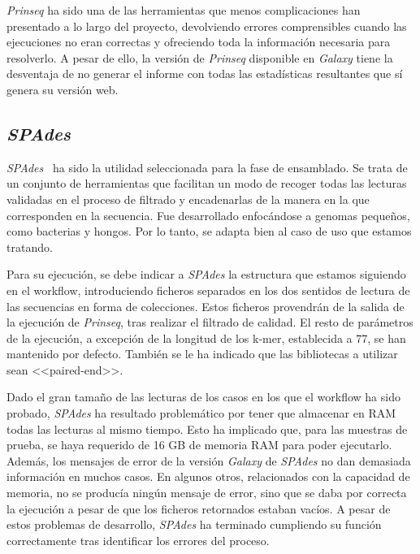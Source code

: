 \textit{Prinseq} ha sido una de las herramientas que menos complicaciones han presentado a lo largo del proyecto, devolviendo errores comprensibles cuando las ejecuciones no eran correctas y ofreciendo toda la información necesaria para resolverlo. A pesar de ello, la versión de \textit{Prinseq} disponible en \textit{Galaxy} tiene la desventaja de no generar el informe con todas las estadísticas resultantes que sí genera su versión web.

\subsection{\itshape{SPAdes}}
\textit{SPAdes}~\cite{Nurk2013} ha sido la utilidad seleccionada para la fase de ensamblado. Se trata de un conjunto de herramientas que facilitan un modo de recoger todas las lecturas validadas en el proceso de filtrado y encadenarlas de la manera en la que corresponden en la secuencia. Fue desarrollado enfocándose a genomas pequeños, como bacterias y hongos. Por lo tanto, se adapta bien al caso de uso que estamos tratando.

Para su ejecución, se debe indicar a \textit{SPAdes} la estructura que estamos siguiendo en el workflow, introduciendo ficheros separados en los dos sentidos de lectura de las secuencias en forma de colecciones. Estos ficheros provendrán de la salida de la ejecución de \textit{Prinseq}, tras realizar el filtrado de calidad. El resto de parámetros de la ejecución, a excepción de la longitud de los k-mer, establecida a 77, se han mantenido por defecto. También se le ha indicado que las bibliotecas a utilizar sean <<paired-end>>.

Dado el gran tamaño de las lecturas de los casos en los que el workflow ha sido probado, \textit{SPAdes} ha resultado problemático por tener que almacenar en RAM todas las lecturas al mismo tiempo. Esto ha implicado que, para las muestras de prueba, se haya requerido de 16 GB de memoria RAM para poder ejecutarlo. Además, los mensajes de error de la versión \textit{Galaxy} de \textit{SPAdes} no dan demasiada información en muchos casos. En algunos otros, relacionados con la capacidad de memoria, no se producía ningún mensaje de error, sino que se daba por correcta la ejecución a pesar de que los ficheros retornados estaban vacíos. A pesar de estos problemas de desarrollo, \textit{SPAdes} ha terminado cumpliendo su función correctamente tras identificar los errores del proceso. 

